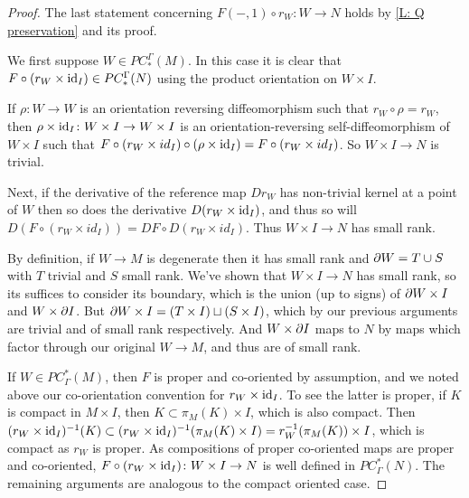 \begin{proof}
The last statement concerning $F(-,1) \circ r_W: W \to N$ holds by \cref{L: Q preservation} and its proof.

We first suppose $W \in PC_*^\Gamma(M)$. In this case it is clear that $F \circ (r_W \times \mathrm{id}_I) \in PC_*^\Gamma(N)$ using the product orientation on $W \times I$.

	If $\rho \colon W \to W$ is an orientation reversing diffeomorphism such that $r_W \circ \rho = r_W$, then
	 $\rho \times \mathrm{id}_I \colon W \times I \to W \times I$ is an orientation-reversing self-diffeomorphism of $W \times I$ such that $F\circ(r_W \times id_I) \circ (\rho \times \mathrm{id}_I) = F\circ(r_W \times id_I)$.
	 So $W \times I \to N$ is trivial.

	Next, if the derivative of the reference map $Dr_W$ has non-trivial kernel at a point of $W$ then so does
	 the derivative $D(r_W \times \mathrm{id}_I)$, and thus so
	 will $D(F \circ (r_W \times id_I)) = DF \circ D(r_W \times id_I)$. Thus $W \times I \to N$ has small rank.

	By definition, if $W \to M$ is degenerate then it has small rank and $\partial W = T \cup S$ with $T$ trivial and $S$ small rank.
	We've shown that $W \times I \to N$ has small rank, so its suffices to consider its boundary,
	which is the union (up to signs) of $\partial W \times I$ and $W \times \partial I$. But $\partial W \times I = (T \times I) \sqcup (S \times I)$, which by our previous
	arguments are trivial and of small rank respectively. And $W \times \partial I$ maps to $N$ by maps which factor through our original $W \to M$,
	and thus are of small rank.


If $W \in PC^*_\Gamma(M)$, then $F$ is proper and co-oriented by assumption, and we noted above our co-orientation convention for $r_W \times \mathrm{id}_I$. To see the latter is proper, if $K$ is compact in $M \times I$, then $K \subset \pi_M(K) \times I$, which is also compact. Then $(r_W \times \mathrm{id}_I)^{-1}(K) \subset (r_W \times \mathrm{id}_I)^{-1}(\pi_M(K) \times I) = r_W^{-1}(\pi_M(K)) \times I$, which is compact as $r_W$ is proper.
As compositions of proper co-oriented maps are proper and co-oriented, $F \circ (r_W \times \mathrm{id}_I) \colon W \times I \to N$ is well defined in $PC^*_\Gamma(N)$. The remaining arguments are analogous to the compact oriented case.
\end{proof}

